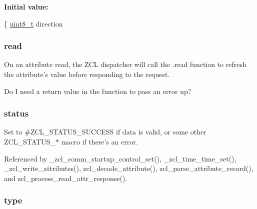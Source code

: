 {\bfseries Initial value\-:}
\begin{DoxyCode}
\{
      \hyperlink{group__hal_gae1affc9ca37cfb624959c866a73f83c2}{uint8\_t} direction
\end{DoxyCode}
\hypertarget{group__zcl_ga80943597b8cce9d751a45efa823596ac}{
\subsubsection[{read}]{ read}}\label{group__zcl_ga80943597b8cce9d751a45efa823596ac}


On an attribute read, the Z\-C\-L dispatcher will call the .read function to refresh the attribute's value before responding to the request. 

Do I need a return value in the function to pass an error up? \hypertarget{group__zcl_gade818037fd6c985038ff29656089758d}{
\subsubsection[{status}]{ status}}\label{group__zcl_gade818037fd6c985038ff29656089758d}


Set to \#\-Z\-C\-L\-\_\-\-S\-T\-A\-T\-U\-S\-\_\-\-S\-U\-C\-C\-E\-S\-S if data is valid, or some other Z\-C\-L\-\_\-\-S\-T\-A\-T\-U\-S\-\_\-$\ast$ macro if there's an error. 



Referenced by \-\_\-zcl\-\_\-comm\-\_\-startup\-\_\-control\-\_\-set(), \-\_\-zcl\-\_\-time\-\_\-time\-\_\-set(), \-\_\-zcl\-\_\-write\-\_\-attributes(), zcl\-\_\-decode\-\_\-attribute(), zcl\-\_\-parse\-\_\-attribute\-\_\-record(), and zcl\-\_\-process\-\_\-read\-\_\-attr\-\_\-response().

\hypertarget{group__zcl_ga1d127017fb298b889f4ba24752d08b8e}{
\subsubsection[{type}]{ type}}\label{group__zcl_ga1d127017fb298b889f4ba24752d08b8e}



